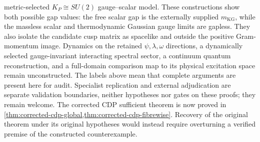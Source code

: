 metric-selected \(K_P\cong SU(2)\) gauge--scalar model.  These constructions
show both possible gap values: the free scalar gap is the externally supplied
\(m_{\mathrm{KG}}\), while the massless scalar and thermodynamic Gaussian
gauge limits are gapless.  They also isolate the candidate cusp matrix as
spacelike and outside the positive Gram-momentum image.  Dynamics on the
retained \(\psi,\lambda,\omega\) directions, a dynamically selected
gauge-invariant interacting spectral sector, a continuum quantum
reconstruction, and a full-domain comparison map to its physical excitation
space remain unconstructed.  The labels above mean that
complete arguments are present here for audit.  Specialist
replication and external adjudication are
separate validation boundaries, neither hypotheses nor gates on these
proofs; they remain welcome.  The corrected CDP sufficient theorem is now
proved in
\cref{thm:corrected-cdp-global,thm:corrected-cdp-fibrewise}.  Recovery of
the original theorem under its original hypotheses would instead require
overturning a verified premise of the constructed counterexample.
